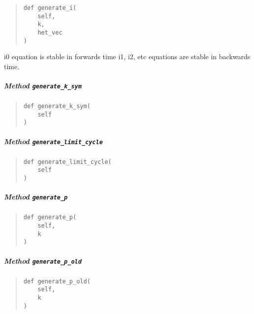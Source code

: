 \documentclass[english,a4paper,oneside]{article}
\let\oldsubparagraph\subparagraph
\renewcommand{\subparagraph}[1]{\oldsubparagraph{#1}\mbox{}}
\begin{document}
\begin{quote}
\begin{verbatim}
def generate_i(
    self,
    k,
    het_vec
)
\end{verbatim}
\end{quote}

i0 equation is stable in forwards time i1, i2, etc equations are stable
in backwards time.

\hypertarget{StrongCoupling.StrongCoupling.generate_k_sym}{%
\subparagraph{\texorpdfstring{Method
\texttt{generate\_k\_sym}}{Method generate\_k\_sym}}\label{StrongCoupling.StrongCoupling.generate_k_sym}}

\begin{quote}
\begin{verbatim}
def generate_k_sym(
    self
)
\end{verbatim}
\end{quote}

\hypertarget{StrongCoupling.StrongCoupling.generate_limit_cycle}{%
\subparagraph{\texorpdfstring{Method
\texttt{generate\_limit\_cycle}}{Method generate\_limit\_cycle}}\label{StrongCoupling.StrongCoupling.generate_limit_cycle}}

\begin{quote}
\begin{verbatim}
def generate_limit_cycle(
    self
)
\end{verbatim}
\end{quote}

\hypertarget{StrongCoupling.StrongCoupling.generate_p}{%
\subparagraph{\texorpdfstring{Method
\texttt{generate\_p}}{Method generate\_p}}\label{StrongCoupling.StrongCoupling.generate_p}}

\begin{quote}
\begin{verbatim}
def generate_p(
    self,
    k
)
\end{verbatim}
\end{quote}

\hypertarget{StrongCoupling.StrongCoupling.generate_p_old}{%
\subparagraph{\texorpdfstring{Method
\texttt{generate\_p\_old}}{Method generate\_p\_old}}\label{StrongCoupling.StrongCoupling.generate_p_old}}

\begin{quote}
\begin{verbatim}
def generate_p_old(
    self,
    k
)
\end{verbatim}
\end{quote}
\end{document}
